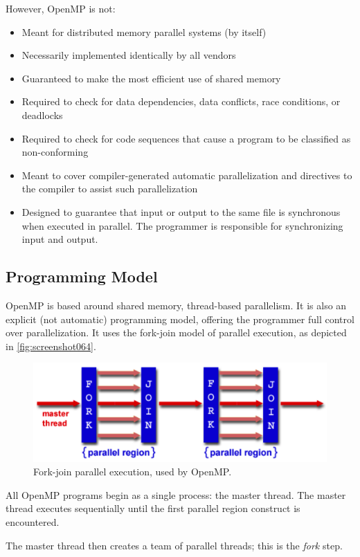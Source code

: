 However, OpenMP is not: \begin{itemize}
\item Meant for distributed memory parallel systems (by itself)  
\item Necessarily implemented identically by all vendors  
\item Guaranteed to make the most efficient use of shared memory  
\item Required to check for data dependencies, data conflicts, race conditions, or deadlocks  
\item Required to check for code sequences that cause a program to be classified as non-conforming  
\item Meant to cover compiler-generated automatic parallelization and directives to the compiler to assist such parallelization  
\item Designed to guarantee that input or output to the same file is synchronous when executed in parallel. The programmer is responsible for synchronizing input and output.  
\end{itemize}

\subsection{Programming Model}
OpenMP is based around shared memory, thread-based parallelism. It is also an explicit (not automatic) programming model, offering the programmer full control over parallelization. It uses the fork-join model of parallel execution, as depicted in \autoref{fig:screenshot064}.

\begin{figure}
\centering
\includegraphics[width=0.7\linewidth]{screenshot064}
\caption{Fork-join parallel execution, used by OpenMP.}
\label{fig:screenshot064}
\end{figure}

All OpenMP programs begin as a single process: the master thread. The master thread executes sequentially until the first parallel region construct is encountered.

The master thread then creates a team of parallel threads; this is the \textit{fork} step.

